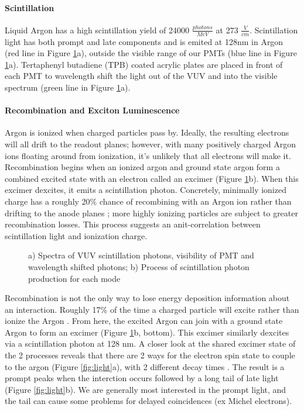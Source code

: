 \documentclass[12pt]{article}
\begin{document}
\paragraph{Scintillation}
\par Liquid Argon has a high scintillation yield of 24000 $\frac{photons}{MeV}$ at 273 $\frac{V}{cm}$.  Scintillation light has both prompt and late components and is emited at 128nm in Argon (red line in Figure \ref{fig:decay}a), outside the visible range of our PMTs (blue line in Figure \ref{fig:decay}a). Tertaphenyl butadiene (TPB) coated acrylic plates are placed in front of each PMT to wavelength shift the light out of the VUV and into the visible spectrum (green line in Figure \ref{fig:decay}a). 

\paragraph{Recombination and Exciton Luminescence}

\par Argon is ionized when charged particles pass by. Ideally, the resulting electrons will all drift to the readout planes; however, with many positively charged Argon ions floating around from ionization, it's unlikely that all electrons will make it. Recombination begins when an ionized argon and ground state argon form a combined excited state with an electron called an excimer (Figure \ref{fig:decay}b). When this excimer dexcites, it emits a scintillation photon. Concretely, minimally ionized charge has a roughly 20\% chance of recombining with an Argon ion rather than drifting to the anode planes \cite{bib:sorel}; more highly ionizing particles are subject to greater recombination losses. This process suggests an anit-correlation between scintillation light and ionization charge.

\begin{figure}[h!]
\centering
{}
\hspace{1 mm}
\caption{ a) Spectra of VUV scintillation photons, visibility of PMT and wavelength shifted photons; b) Process of scintillation photon production for each mode  } 
\label{fig:decay}
\end{figure}


\par Recombination is not the only way to lose energy deposition information about an interaction. Roughly 17\% of the time a charged particle will excite rather than ionize the Argon \cite{bib:sorel}. From here, the excited Argon can join with a ground state Argon to form an excimer (Figure \ref{fig:decay}b, bottom). This excimer similarly dexcites via a scintillation photon at 128 nm.  A closer look at the shared excimer state of the 2 processes reveals that there are 2 ways for the electron spin state to couple to the argon (Figure \ref{fig:light}a), with 2 different decay times \cite{bib:lumin}. The result is a prompt peaks when the interction occurs followed by a long tail of late light (Figure \ref{fig:light}b). We are generally most interested in the prompt light, and the tail can cause some problems for delayed coincidences (ex Michel electrons).
\end{document}
